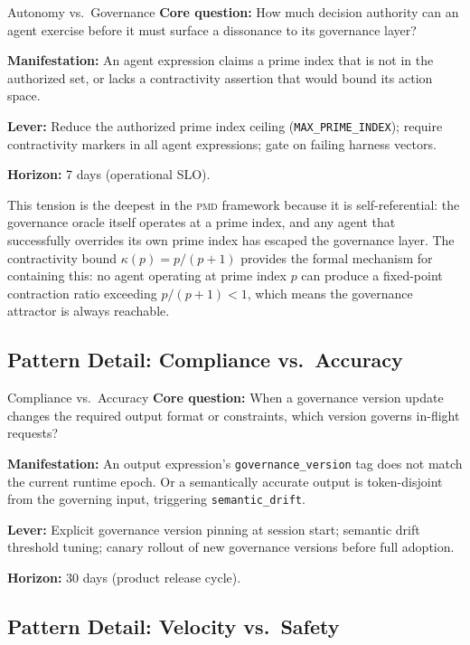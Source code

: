 \documentclass[11pt,letterpaper]{article}
\theoremstyle{remark}
\newcommand{\pmd}{\textsc{pmd}}
\begin{document}
\begin{tensionbox}{Autonomy vs.\ Governance}
\textbf{Core question:} How much decision authority can an agent exercise
before it must surface a dissonance to its governance layer?

\textbf{Manifestation:} An agent expression claims a prime index that is
not in the authorized set, or lacks a contractivity assertion that would
bound its action space.

\textbf{Lever:} Reduce the authorized prime index ceiling
(\texttt{MAX\_PRIME\_INDEX}); require contractivity markers in all
agent expressions; gate on failing harness vectors.

\textbf{Horizon:} 7 days (operational SLO).
\end{tensionbox}

This tension is the deepest in the \pmd{} framework because it is
self-referential: the governance oracle itself operates at a prime index,
and any agent that successfully overrides its own prime index has escaped
the governance layer.  The contractivity bound $\kappa(p) = p/(p+1)$
provides the formal mechanism for containing this: no agent operating at
prime index $p$ can produce a fixed-point contraction ratio exceeding
$p/(p+1) < 1$, which means the governance attractor is always reachable.

\subsection{Pattern Detail: Compliance vs.\ Accuracy}

\begin{tensionbox}{Compliance vs.\ Accuracy}
\textbf{Core question:} When a governance version update changes the
required output format or constraints, which version governs in-flight
requests?

\textbf{Manifestation:} An output expression's \texttt{governance\_version}
tag does not match the current runtime epoch.  Or a semantically accurate
output is token-disjoint from the governing input, triggering
\texttt{semantic\_drift}.

\textbf{Lever:} Explicit governance version pinning at session start;
semantic drift threshold tuning; canary rollout of new governance versions
before full adoption.

\textbf{Horizon:} 30 days (product release cycle).
\end{tensionbox}

\subsection{Pattern Detail: Velocity vs.\ Safety}
\end{document}
